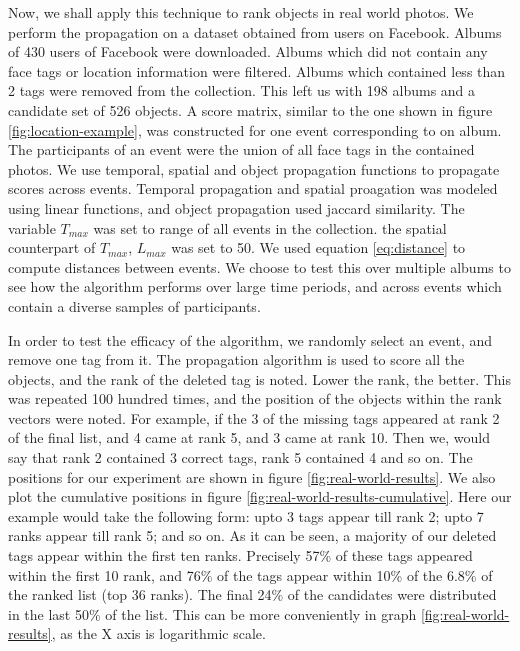 Now, we shall apply this technique to rank objects in real world photos. We perform the propagation on a dataset obtained from users on Facebook. Albums of 430 users of Facebook were downloaded. Albums which did not contain any face tags or location information were filtered. Albums which contained less than 2 tags were removed from the collection. This left us with 198 albums and a candidate set of 526 objects. A score matrix, similar to the one shown in figure \ref{fig:location-example}, was constructed for one event corresponding to on album. The participants of an event were the union of all face tags in the contained photos. We use temporal, spatial and object propagation functions to propagate scores across events. Temporal propagation and spatial proagation was modeled using linear functions, and object propagation used jaccard similarity. The variable $T_{max}$ was set to range of all events in the collection. the spatial counterpart of $T_{max}$, $L_{max}$ was set to 50. We used equation \ref{eq:distance} to compute distances between events. We choose to test this over multiple albums to see how the algorithm performs over large time periods, and across events which contain a diverse samples of participants.

In order to test the efficacy of the algorithm, we randomly select an event, and remove one tag from it. The propagation algorithm is used to score all the objects, and the rank of the deleted tag is noted. Lower the rank, the better. This was repeated 100 hundred times, and the position of the objects within the rank vectors were noted. For example, if the 3 of the missing tags appeared at rank 2 of the final list, and 4 came at rank 5, and 3 came at rank 10. Then we, would say that rank 2 contained 3 correct tags, rank 5 contained 4 and so on. The positions for our experiment are shown in figure \ref{fig:real-world-results}. We also plot the cumulative positions in figure \ref{fig:real-world-results-cumulative}. Here our example would take the following form: upto 3 tags appear till rank 2; upto 7 ranks appear till rank 5; and so on. As it can be seen, a majority of our deleted tags appear within the first ten ranks. Precisely 57\% of these tags appeared within the first 10 rank, and 76\% of the tags appear within 10\% of the 6.8\% of the ranked list (top 36 ranks). The final 24\% of the candidates were distributed in the last 50\% of the list. This can be more conveniently in graph \ref{fig:real-world-results}, as the X axis is logarithmic scale.

